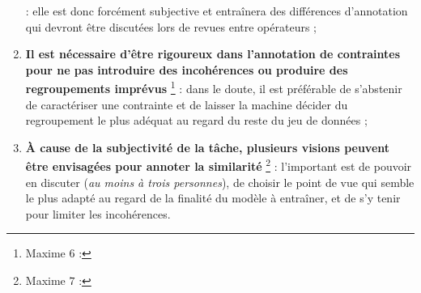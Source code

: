 \begin{enumerate}
{			} : elle est donc forcément subjective et entraînera des différences d'annotation qui devront être discutées lors de revues entre opérateurs ;
			\item \textbf{Il est nécessaire d'être rigoureux dans l'annotation de contraintes pour ne pas introduire des incohérences ou produire des regroupements imprévus} \footnote{
				Maxime $6$ : 
			} :
			dans le doute, il est préférable de s'abstenir de caractériser une contrainte et de laisser la machine décider du regroupement le plus adéquat au regard du reste du jeu de données ;
			\item \textbf{À cause de la subjectivité de la tâche, plusieurs visions peuvent être envisagées pour annoter la similarité} \footnote{
				Maxime $7$ : 
			} :
			l'important est de pouvoir en discuter (\textit{au moins à trois personnes}), de choisir le point de vue qui semble le plus adapté au regard de la finalité du modèle à entraîner, et de s'y tenir pour limiter les incohérences.
		\end{enumerate}
